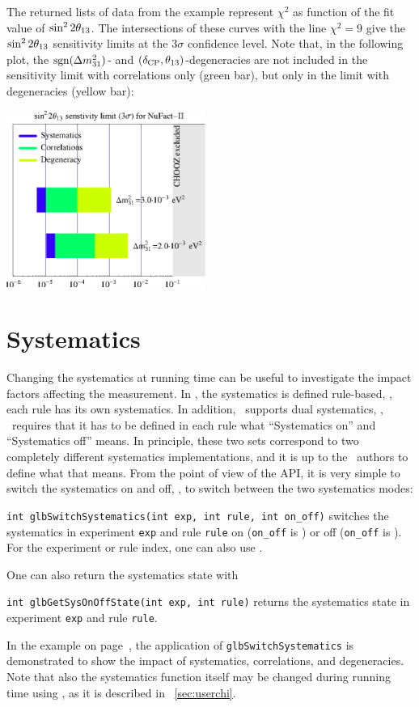 {The returned lists of data from the example represent $\chi^2$ 
as function of the fit value of $\sin^2 2 \theta_{13}$. The intersections of these
curves with the line $\chi^2 = 9$ give the $\sin^2 2 \theta_{13}$ sensitivity
limits at the $3 \sigma$ confidence level. Note that, in the following
plot, the $\mathrm{sgn}(\Delta m_{31}^2)$- and $(\delta_{\mathrm{CP}},\theta_{13})$-degeneracies
are not included in the sensitivity limit with correlations only (green bar),
but only in the limit with degeneracies (yellow bar):
\begin{center}
\colorbox{white}{\includegraphics[width=6.5cm]{barsex}}
\end{center}
}

\section{Systematics}
\label{sec:systematics}

Changing the systematics at running time can be useful to investigate
the impact factors affecting the measurement.
In \GLOBES , the systematics is defined rule-based, \ie, each rule
has its own systematics. 
In addition, \GLOBES\ supports dual systematics, \ie, \AEDL\ requires that it has to be
defined in each rule what ``Systematics on'' and ``Systematics off'' means.
In principle, these two sets correspond to two completely different systematics
implementations, and it is up to the \AEDL\ authors to define what that means.
From the point of view of the API, it is very simple to switch the systematics on and off, \ie,
to switch between the two systematics modes:
\begin{function}
{\tt int glbSwitchSystematics(int exp, int rule, int on\_off)}
switches the systematics in experiment {\tt exp} and rule {\tt rule}
on ({\tt on\_off} is ) or off ({\tt on\_off} is ). For the experiment or
rule index, one can also use . 
\end{function}
One can also return the systematics state with
\begin{function}
{\tt int glbGetSysOnOffState(int exp, int rule)}
returns the systematics state in experiment {\tt exp} and rule {\tt rule}. 
\end{function}
In the example on page~\pageref{ex:barcharts}, the application of
{\tt glbSwitchSystematics} is demonstrated to show the impact of
systematics, correlations, and degeneracies.
Note that also the systematics function itself may be changed during running time
using , as it is described in \Sec~\ref{sec:userchi}.

